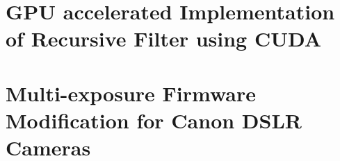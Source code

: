 \begin{appendices}
\chapter{GPU accelerated Implementation of Recursive Filter using CUDA}
\label{apx:gpu}







\chapter{Multi-exposure Firmware Modification for Canon DSLR Cameras}
\label{apx:5dIII}


\end{appendices}